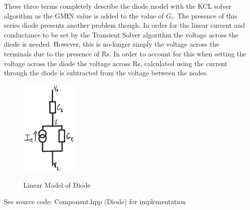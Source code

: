 \documentclass{article}
\begin{document}
These three terms completely describe the diode model with the KCL solver algorithm as the GMIN value is added to the value of $G_l$. The presence of this series diode presents another problem though. In order for the linear current and conductance to be set by the Transient Solver algorithm the voltage across the diode is needed. However, this is no-longer simply the voltage across the terminals due to the presence of Rs. In order to account for this when setting the voltage across the diode the voltage across Rs, calculated using the current through the diode is subtracted from the voltage between the nodes. 
\begin{figure}[h]
    \caption{Linear Model of Diode}
    \centering
    \includegraphics[width=0.25\textwidth]{images/DiodeCircuit.png}
    \label{fig:diode}
\end{figure}
\bigbreak
See source code: Component.hpp (Diode) for implementation
\newpage
\end{document}
